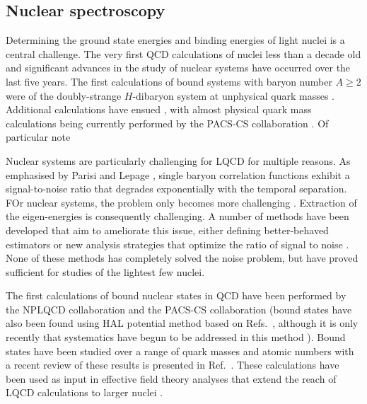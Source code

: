 
 

\subsection{Nuclear spectroscopy}

Determining the ground state energies and binding energies of light nuclei is a central challenge. The very first QCD calculations of nuclei less than a decade old and significant advances in the study of nuclear systems have occurred over the last five years.
The first calculations of bound systems with baryon number $A\ge2$ were of the doubly-strange $H$-dibaryon system at unphysical quark masses
\cite{Beane:2010hg,Inoue:2010es,Beane:2011xf}. Additional calculations have ensued \cite{Beane:2012vq,Yamazaki:2012hi,Yamazaki:2015asa}, with almost physical quark mass calculations being currently performed by the PACS-CS collaboration \cite{}. Of particular note

Nuclear systems are particularly challenging for LQCD for multiple reasons. As emphasised by Parisi and Lepage \cite{Lepage:1989hd,Parisi:1983ae,Hamber:1983vu}, single baryon correlation functions exhibit a signal-to-noise ratio that degrades exponentially with the temporal separation. FOr nuclear systems, the problem only becomes more challenging \cite{Beane:2009kya,Beane:2009gs}. Extraction of the eigen-energies is consequently challenging. A number of methods have been developed that aim to ameliorate this issue, either defining better-behaved estimators \cite{Beane:2014oea,Wagman:2017gqi,Wagman:2017xfh,Wagman:2016bam} or new analysis strategies that optimize the ratio of signal to noise \cite{Detmold:2014hla}. None of these methods has completely solved the noise problem, but have proved sufficient for studies of the lightest few nuclei. 

The first calculations of bound nuclear states in QCD have been performed by the NPLQCD collaboration \cite{} and the PACS-CS collaboration (bound states have also been found using HAL potential method \cite{} based on Refs.~\cite{}, although it is only recently that systematics have begun to be addressed in this method \cite{}). Bound states have been studied over a range of quark masses and atomic numbers with a recent review of these results is presented in Ref.~\cite{}. These calculations have been used as input in effective field theory analyses that extend the reach of LQCD calculations to larger nuclei \cite{Barnea:2013uqa,MORE}.

